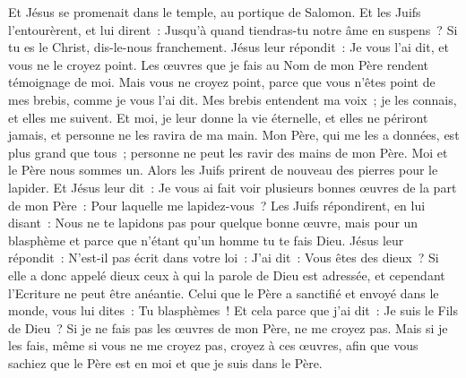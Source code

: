 \begin{multicols}{2}
Et Jésus se promenait dans le temple, au portique de Salomon.
Et les Juifs l'entourèrent, et lui dirent~: Jusqu'à quand tiendras-tu notre âme en suspens~? Si tu es le Christ, dis-le-nous franchement.
Jésus leur répondit~: Je vous l'ai dit, et vous ne le croyez point. Les œuvres que je fais au Nom de mon Père rendent témoignage de moi.
Mais vous ne croyez point, parce que vous n'êtes point de mes brebis, comme je vous l'ai dit.
Mes brebis entendent ma voix~; je les connais, et elles me suivent.
Et moi, je leur donne la vie éternelle, et elles ne périront jamais, et personne ne les ravira de ma main.
Mon Père, qui me les a données, est plus grand que tous~; personne ne peut les ravir des mains de mon Père.
Moi et le Père nous sommes un.
Alors les Juifs prirent de nouveau des pierres pour le lapider.
Et Jésus leur dit~: Je vous ai fait voir plusieurs bonnes œuvres de la part de mon Père~: Pour laquelle me lapidez-vous~?
Les Juifs répondirent, en lui disant~: Nous ne te lapidons pas pour quelque bonne œuvre, mais pour un blasphème et parce que n'étant qu'un homme tu te fais Dieu.
Jésus leur répondit~: N'est-il pas écrit dans votre loi~: J'ai dit~: Vous êtes des dieux~?
Si elle a donc appelé dieux ceux à qui la parole de Dieu est adressée, et cependant l'Ecriture ne peut être anéantie.
Celui que le Père a sanctifié et envoyé dans le monde, vous lui dites~: Tu blasphèmes~! Et cela parce que j'ai dit~: Je suis le Fils de Dieu~?
Si je ne fais pas les œuvres de mon Père, ne me croyez pas.
Mais si je les fais, même si vous ne me croyez pas, croyez à ces œuvres, afin que vous sachiez que le Père est en moi et que je suis dans le Père.

\end{multicols}
